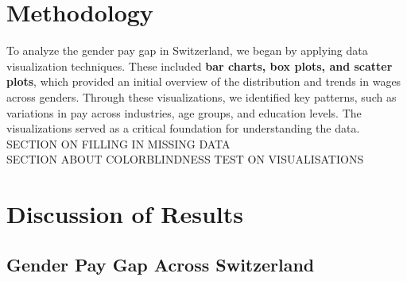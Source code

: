 \documentclass{article}
\begin{document}
\section{Methodology}

To analyze the gender pay gap in Switzerland, we began by applying data visualization techniques. These included \textbf{bar charts, box plots, and scatter plots}, which provided an initial overview of the distribution and trends in wages across genders. Through these visualizations, we identified key patterns, such as variations in pay across industries, age groups, and education levels. The visualizations served as a critical foundation for understanding the data.\\

SECTION ON FILLING IN MISSING DATA\\

SECTION ABOUT COLORBLINDNESS TEST ON VISUALISATIONS\\

\section{Discussion of Results}

\subsection{Gender Pay Gap Across Switzerland}

\begin{table}[H]
\centering
{}\
\caption{Descriptive Statistics on Gender Pay Gap Across Switzerland and Years}
\end{table}
\end{document}
